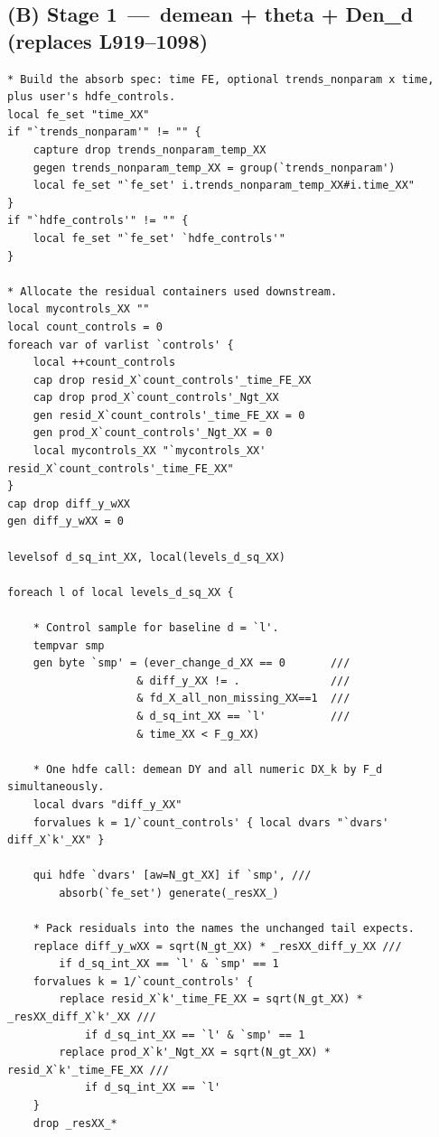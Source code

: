 \documentclass[11pt]{article}
\newcommand{\1}{\mathbb{1}}
\begin{document}
\subsection*{(B) Stage 1 \,---\, demean + theta + Den\_d (replaces L919--1098)}

\begin{lstlisting}
* Build the absorb spec: time FE, optional trends_nonparam x time, plus user's hdfe_controls.
local fe_set "time_XX"
if "`trends_nonparam'" != "" {
    capture drop trends_nonparam_temp_XX
    gegen trends_nonparam_temp_XX = group(`trends_nonparam')
    local fe_set "`fe_set' i.trends_nonparam_temp_XX#i.time_XX"
}
if "`hdfe_controls'" != "" {
    local fe_set "`fe_set' `hdfe_controls'"
}

* Allocate the residual containers used downstream.
local mycontrols_XX ""
local count_controls = 0
foreach var of varlist `controls' {
    local ++count_controls
    cap drop resid_X`count_controls'_time_FE_XX
    cap drop prod_X`count_controls'_Ngt_XX
    gen resid_X`count_controls'_time_FE_XX = 0
    gen prod_X`count_controls'_Ngt_XX = 0
    local mycontrols_XX "`mycontrols_XX' resid_X`count_controls'_time_FE_XX"
}
cap drop diff_y_wXX
gen diff_y_wXX = 0

levelsof d_sq_int_XX, local(levels_d_sq_XX)

foreach l of local levels_d_sq_XX {

    * Control sample for baseline d = `l'.
    tempvar smp
    gen byte `smp' = (ever_change_d_XX == 0       ///
                    & diff_y_XX != .              ///
                    & fd_X_all_non_missing_XX==1  ///
                    & d_sq_int_XX == `l'          ///
                    & time_XX < F_g_XX)

    * One hdfe call: demean DY and all numeric DX_k by F_d simultaneously.
    local dvars "diff_y_XX"
    forvalues k = 1/`count_controls' { local dvars "`dvars' diff_X`k'_XX" }

    qui hdfe `dvars' [aw=N_gt_XX] if `smp', ///
        absorb(`fe_set') generate(_resXX_)

    * Pack residuals into the names the unchanged tail expects.
    replace diff_y_wXX = sqrt(N_gt_XX) * _resXX_diff_y_XX ///
        if d_sq_int_XX == `l' & `smp' == 1
    forvalues k = 1/`count_controls' {
        replace resid_X`k'_time_FE_XX = sqrt(N_gt_XX) * _resXX_diff_X`k'_XX ///
            if d_sq_int_XX == `l' & `smp' == 1
        replace prod_X`k'_Ngt_XX = sqrt(N_gt_XX) * resid_X`k'_time_FE_XX ///
            if d_sq_int_XX == `l'
    }
    drop _resXX_*


\end{lstlisting}
\end{document}
